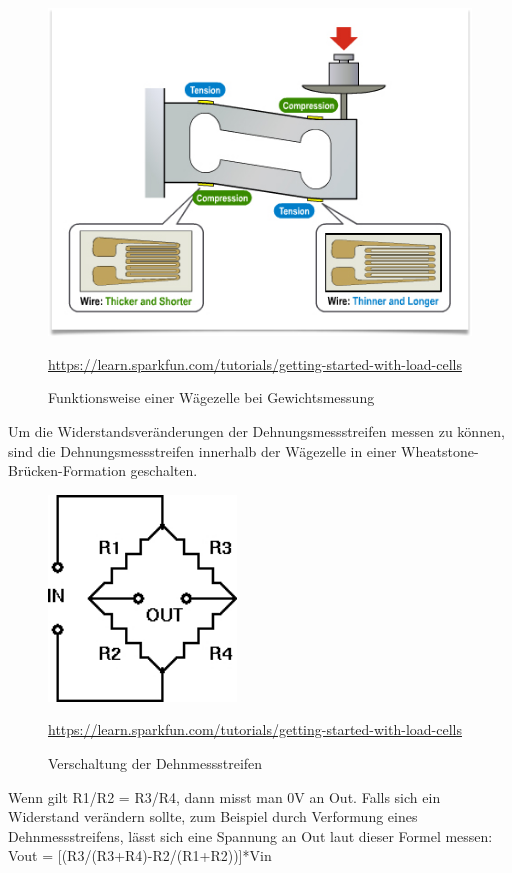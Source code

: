 \begin{figure}[ht]
    \center
    \includegraphics[width=15cm]{Bilder/waegezelle-funktionsweise.png}\\
    \caption{Funktionsweise einer Wägezelle bei Gewichtsmessung }
    \begin{flushleft} \quelle\url{https://learn.sparkfun.com/tutorials/getting-started-with-load-cells} \end{flushleft}
\end{figure}
Um die Widerstandsveränderungen der Dehnungsmessstreifen messen zu können, sind die Dehnungsmessstreifen innerhalb der Wägezelle in einer Wheatstone-Brücken-Formation geschalten.

\newpage

\begin{figure}[ht]
    \center
    \includegraphics[width=5cm]{Bilder/waegezelle-verschaltung.jpg}\\
    \caption{Verschaltung der Dehnmessstreifen}
    \begin{flushleft} \quelle\url{https://learn.sparkfun.com/tutorials/getting-started-with-load-cells} \end{flushleft}
\end{figure}
Wenn gilt R1/R2 = R3/R4, dann misst man 0V an Out. Falls sich ein Widerstand verändern sollte, zum Beispiel durch Verformung eines Dehnmessstreifens, lässt sich eine Spannung an Out laut dieser Formel messen: \\
Vout = [(R3/(R3+R4)-R2/(R1+R2))]*Vin\\

